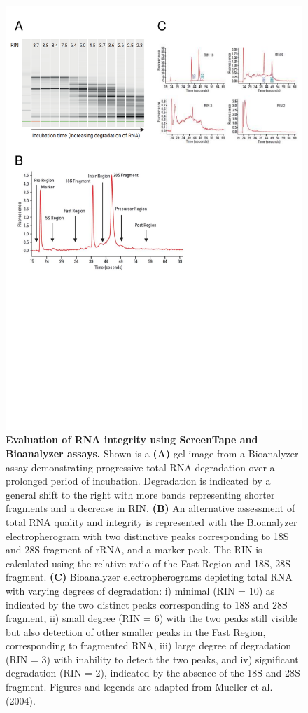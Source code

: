 \begin{figure}[htp]
	\centering
	\vspace{20pt}
	\includegraphics[page=1,trim={0 10cm 0 0 },clip, scale = 0.7]{Figures/General_Methodology_Figures.pdf}
	\captionsetup{width=0.95\textwidth}
	\caption[Evaluation of RNA integrity using ScreenTape and Bioanalyzer assays]%
	{\textbf{Evaluation of RNA integrity using ScreenTape and Bioanalyzer assays.} Shown is a \textbf{(A)} gel image from a Bioanalyzer assay demonstrating progressive total RNA degradation over a prolonged period of incubation. Degradation is indicated by a general shift to the right with more bands representing shorter fragments and a decrease in RIN. \textbf{(B)} An alternative assessment of total RNA quality and integrity is represented with the Bioanalyzer electropherogram with two distinctive peaks corresponding to 18S and 28S fragment of rRNA, and a marker peak. The RIN is calculated using the relative ratio of the Fast Region and 18S, 28S fragment. \textbf{(C)} Bioanalyzer electropherograms depicting total RNA with varying degrees of degradation: i) minimal (RIN = 10) as indicated by the two distinct peaks corresponding to 18S and 28S fragment, ii) small degree (RIN = 6) with the two peaks still visible but also detection of other smaller peaks in the Fast Region, corresponding to fragmented RNA, iii) large degree of degradation (RIN = 3) with inability to detect the two peaks, and iv) significant degradation (RIN = 2), indicated by the absence of the 18S and 28S fragment. Figures and legends are adapted from Mueller et al. (2004)\cite{Mueller}.}

\end{figure}
